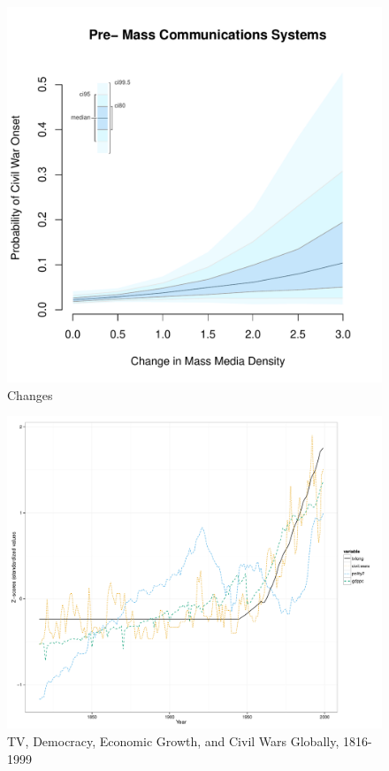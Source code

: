 \documentclass[11pt,article,oneside]{memoir}
\makeatletter
\def\maxwidth{\ifdim\Gin@nat@width>\linewidth\linewidth
\else\Gin@nat@width\fi}
\let\Oldincludegraphics\includegraphics
\renewcommand{\includegraphics}[1]{\Oldincludegraphics[width=\maxwidth]{#1}}
\makeatother
\begin{document}
\clearpage

\begin{figure} 
\includegraphics{figure/d_mdi_effect.pdf} 
\caption{Changes} 
\label{myFigz} 
\end{figure}

\begin{figure}[htbp]
\centering
\includegraphics{figure/longrunplot.pdf}
\caption{TV, Democracy, Economic Growth, and Civil Wars Globally,
1816-1999}
\end{figure}
\end{document}
